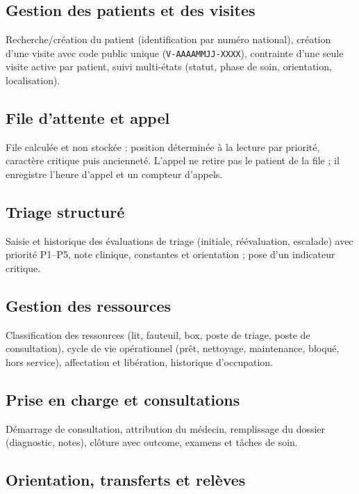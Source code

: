 \subsection{Gestion des patients et des visites}

Recherche/création du patient (identification par numéro national), création d'une visite avec code public unique (\texttt{V-AAAAMMJJ-XXXX}), contrainte d'une seule visite active par patient, suivi multi-états (statut, phase de soin, orientation, localisation).

\subsection{File d'attente et appel}

File calculée et non stockée : position déterminée à la lecture par priorité, caractère critique puis ancienneté. L'appel ne retire pas le patient de la file ; il enregistre l'heure d'appel et un compteur d'appels.

\subsection{Triage structuré}

Saisie et historique des évaluations de triage (initiale, réévaluation, escalade) avec priorité P1--P5, note clinique, constantes et orientation ; pose d'un indicateur critique.

\subsection{Gestion des ressources}

Classification des ressources (lit, fauteuil, box, poste de triage, poste de consultation), cycle de vie opérationnel (prêt, nettoyage, maintenance, bloqué, hors service), affectation et libération, historique d'occupation.

\subsection{Prise en charge et consultations}

Démarrage de consultation, attribution du médecin, remplissage du dossier (diagnostic, notes), clôture avec outcome, examens et tâches de soin.

\subsection{Orientation, transferts et relèves}

